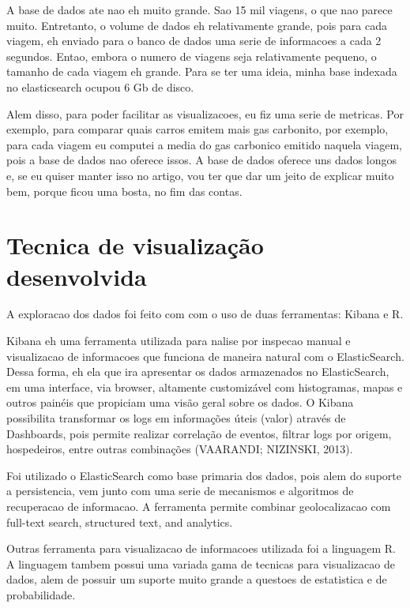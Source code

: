 \documentclass[10pt, conference]{IEEEtran}
\begin{document}
A base de dados ate nao eh muito grande. Sao 15 mil viagens, o que nao parece muito. Entretanto,
o volume de dados eh relativamente grande, pois para cada viagem, eh enviado para o banco de dados
uma serie de informacoes a cada 2 segundos. Entao, embora o numero de viagens seja relativamente 
pequeno, o tamanho de cada viagem eh grande. Para se ter uma ideia, minha base indexada no elasticsearch 
ocupou 6 Gb de disco.

Alem disso, para poder facilitar as visualizacoes, eu fiz uma serie de metricas. Por exemplo, 
para comparar quais carros emitem mais gas carbonito, por exemplo, para cada viagem eu computei
a media do gas carbonico emitido naquela viagem, pois a base de dados nao oferece issos. A base de
dados oferece uns dados longos e, se eu quiser manter isso no artigo, vou ter que dar
um jeito de explicar muito bem, porque ficou uma bosta, no fim das contas.



\section{Tecnica de visualização desenvolvida}
\label{sec:technique}
%
A exploracao dos dados foi feito com com o uso de duas ferramentas: Kibana e R.


Kibana eh uma ferramenta utilizada para nalise por inspecao manual e visualizacao
de informacoes que funciona de maneira natural com o ElasticSearch. Dessa  forma, 
eh  ela  que ira apresentar os dados armazenados no ElasticSearch, em uma interface,  via
browser, altamente customizável com histogramas, mapas e outros painéis que propiciam uma visão
geral sobre os dados.  O Kibana possibilita transformar os logs em informações úteis (valor)
através  de Dashboards,  pois  permite  realizar  correlação  de  eventos,  filtrar logs
por  origem, hospedeiros, entre outras combinações (VAARANDI; NIZINSKI, 2013).

Foi utilizado o ElasticSearch como base primaria dos dados, pois alem do suporte a persistencia,
vem junto com uma serie de mecanismos e algoritmos de recuperacao de informacao. A ferramenta
permite combinar geolocalizacao com full-text search, structured text, and analytics.

Outras ferramenta para visualizacao de informacoes utilizada foi a linguagem R. A linguagem
tambem possui uma variada gama de tecnicas para visualizacao de dados, alem de possuir um
suporte muito grande a questoes de estatistica e de probabilidade. 
\end{document}
